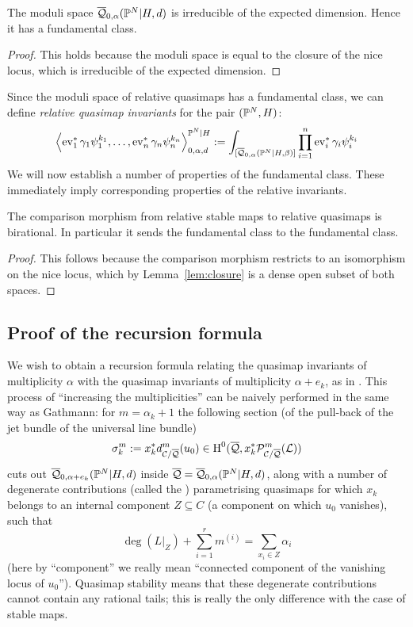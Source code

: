 \begin{cor} The moduli space $\overline{\mathcal Q}_{0,\alpha}(\mathbb P^N|H,d)$ is irreducible of the expected dimension. Hence it has a fundamental class. \end{cor}
\begin{proof} This holds because the moduli space is equal to the closure of the nice locus, which is irreducible of the expected dimension. \end{proof}

Since the moduli space of relative quasimaps has a fundamental class, we can define \emph{relative quasimap invariants} for the pair $(\mathbb P^N,H)$:
\begin{equation*} \left\langle \operatorname{ev}_1^* \gamma_1 \psi_1^{k_1} , \ldots, \operatorname{ev}_n^* \gamma_n \psi_n^{k_n} \right\rangle_{0,\alpha,d}^{\mathbb P^N|H} := \int_{[\overline{\mathcal Q}_{0,\alpha}(\mathbb P^N|H,\beta)]} \prod_{i=1}^n \operatorname{ev}_i^* \gamma_i \psi_i^{k_i} \end{equation*}
We will now establish a number of properties of the fundamental class. These immediately imply corresponding properties of the relative invariants.
\begin{cor} \label{Comparison morphism birational} The comparison morphism from relative stable maps to relative quasimaps is birational. In particular it sends the fundamental class to the fundamental class. \end{cor}
\begin{proof} This follows because the comparison morphism restricts to an isomorphism on the nice locus, which by Lemma~\ref{lem:closure} is a dense open subset of both spaces. \end{proof}


\subsection{Proof of the recursion formula} \label{Subsection recursion formula for PN}
We wish to obtain a recursion formula relating the quasimap invariants of multiplicity $\alpha$ with the quasimap invariants of multiplicity $\alpha + e_k$, as in \cite[Theorem 2.6]{Ga}. This process of ``increasing the multiplicities'' can be naively performed in the same way as Gathmann: for $m = \alpha_k + 1$ the following section (of the pull-back of the jet bundle of the universal line bundle)
\[
\sigma^m_k := x_k^*d^m_{\mathcal C/\overline{\mathcal{Q}}}(u_0)\in \operatorname{H}^0(\overline{\mathcal{Q}},x_k^*\mathcal P^m_{\mathcal C/\overline{\mathcal Q}}(\mathcal L))
\]
cuts out $\overline{\mathcal Q}_{0,\alpha+e_k}(\mathbb P^N|H,d)$ inside $\overline{\mathcal{Q}} = \overline{\mathcal Q}_{0,\alpha}(\mathbb P^N|H,d)$, along with a number of degenerate contributions (called the ) parametrising quasimaps for which $x_k$ belongs to an internal component $Z \subseteq C$ (a component on which $u_0$ vanishes), such that
\begin{equation*}\deg(L|_{Z})+\sum_{i=1}^r m^{(i)}=\sum_{x_i\in Z}\alpha_i \end{equation*}
(here by ``component'' we really mean ``connected component of the vanishing locus of $u_0$''). Quasimap stability means that these degenerate contributions cannot contain any rational tails; this is really the only difference with the case of stable maps.


